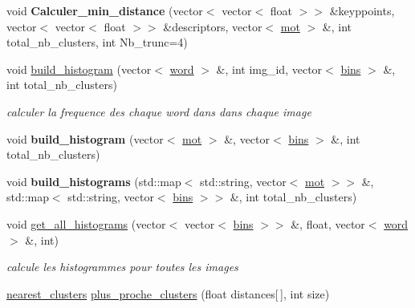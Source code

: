 \begin{DoxyCompactItemize}
\item 
\hypertarget{classhistograms_a3b4cb4ba04b27ba1c57492a7d1e94696}{
void {\bfseries Calculer\_\-min\_\-distance} (vector$<$ vector$<$ float $>$$>$ \&keyppoints, vector$<$ vector$<$ float $>$$>$ \&descriptors, vector$<$ \hyperlink{classmot}{mot} $>$ \&, int total\_\-nb\_\-clusters, int Nb\_\-trunc=4)}
\label{classhistograms_a3b4cb4ba04b27ba1c57492a7d1e94696}

\item 
\hypertarget{classhistograms_acaa5aaf84fa9cfecb7add6b9e6a216e9}{
void \hyperlink{classhistograms_acaa5aaf84fa9cfecb7add6b9e6a216e9}{build\_\-histogram} (vector$<$ \hyperlink{classword}{word} $>$ \&, int img\_\-id, vector$<$ \hyperlink{classbins}{bins} $>$ \&, int total\_\-nb\_\-clusters)}
\label{classhistograms_acaa5aaf84fa9cfecb7add6b9e6a216e9}

\begin{DoxyCompactList}\small\item\em calculer la frequence des chaque word dans dans chaque image \end{DoxyCompactList}\item 
\hypertarget{classhistograms_a647fc134a6cdb0f096390b25c641d892}{
void {\bfseries build\_\-histogram} (vector$<$ \hyperlink{classmot}{mot} $>$ \&, vector$<$ \hyperlink{classbins}{bins} $>$ \&, int total\_\-nb\_\-clusters)}
\label{classhistograms_a647fc134a6cdb0f096390b25c641d892}

\item 
\hypertarget{classhistograms_adfa78c12c3a9470f5ebb2264a265fe04}{
void {\bfseries build\_\-histograms} (std::map$<$ std::string, vector$<$ \hyperlink{classmot}{mot} $>$$>$ \&, std::map$<$ std::string, vector$<$ \hyperlink{classbins}{bins} $>$$>$ \&, int total\_\-nb\_\-clusters)}
\label{classhistograms_adfa78c12c3a9470f5ebb2264a265fe04}

\item 
\hypertarget{classhistograms_a552dd9c1cdf353c47dab5b064e4c416c}{
void \hyperlink{classhistograms_a552dd9c1cdf353c47dab5b064e4c416c}{get\_\-all\_\-histograms} (vector$<$ vector$<$ \hyperlink{classbins}{bins} $>$$>$ \&, float, vector$<$ \hyperlink{classword}{word} $>$ \&, int)}
\label{classhistograms_a552dd9c1cdf353c47dab5b064e4c416c}

\begin{DoxyCompactList}\small\item\em calcule les histogrammes pour toutes les images \end{DoxyCompactList}\item 
\hypertarget{classhistograms_a15e3f552cec3496cb25cf3d10ed0ab32}{
\hyperlink{classnearest__clusters}{nearest\_\-clusters} \hyperlink{classhistograms_a15e3f552cec3496cb25cf3d10ed0ab32}{plus\_\-proche\_\-clusters} (float distances\mbox{[}$\,$\mbox{]}, int size)}
\label{classhistograms_a15e3f552cec3496cb25cf3d10ed0ab32}


\end{DoxyCompactItemize}
